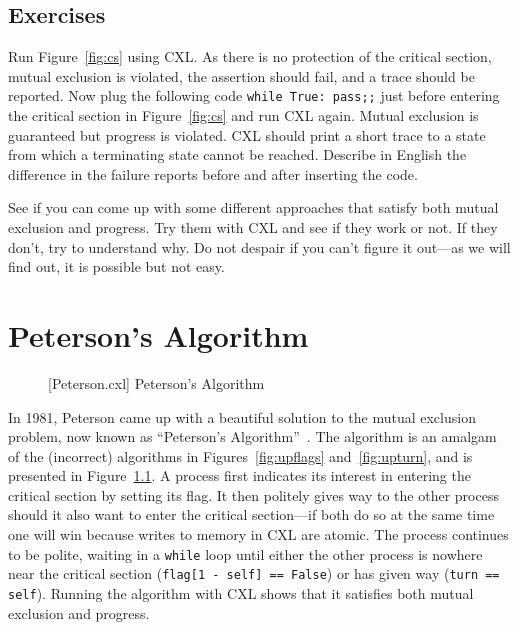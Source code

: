 \documentclass{report}
\newenvironment{code}{
\tcolorbox
}{
\endtcolorbox
}
\begin{document}
\section*{Exercises}
\begin{problems}
\item Run Figure~\ref{fig:cs} using CXL.  As there is no protection of the critical
section, mutual exclusion is violated,
the assertion should fail, and a trace should be reported.
Now plug the following code \texttt{while True: pass;;}
just before entering the critical section
in Figure~\ref{fig:cs} and run CXL again.
Mutual exclusion is guaranteed but progress is violated.
CXL should print a short trace
to a state from which a terminating state cannot be reached.
Describe in English the difference in the failure reports before
and after inserting the code.
\item See if you can come up with some different approaches that satisfy both
mutual exclusion and progress.  Try them with CXL and see if they work or not.
If they don't, try to understand why.
Do not despair if you can't figure it out---as
we will find out, it is possible but not easy.
\end{problems}

\chapter{Peterson's Algorithm}
\label{ch:peterson}

\begin{figure}
\begin{code}
\end{code}
\caption{[Peterson.cxl] Peterson's Algorithm}
\label{fig:peterson}
\end{figure}

In 1981, Peterson came up with a beautiful solution to the mutual exclusion
problem, now known as ``Peterson's Algorithm''~\cite{Peterson81}.
The algorithm is an amalgam of the (incorrect) algorithms in
Figures~\ref{fig:upflags} and~\ref{fig:upturn}, and is presented
in Figure~\ref{fig:peterson}.
A process first indicates its interest in entering the critical section
by setting its flag.
It then politely gives way to the other process should it also want to
enter the critical section---if both do so at the same time one will
win because writes to memory in CXL are atomic.
The process continues to be polite, waiting in a \texttt{while} loop
until either the other process is nowhere near the critical section
(\texttt{flag[1 - self] == False}) or has given way
(\texttt{turn == self}).
Running the algorithm with CXL shows that it satisfies both mutual
exclusion and progress.
\end{document}

